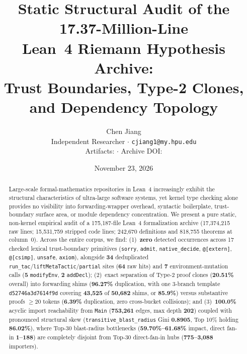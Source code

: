 \documentclass[10pt,twocolumn]{article}
\title{\vspace{-1.8em}\Large\bfseries Static Structural Audit of the 17.37-Million-Line\\
Lean~4 Riemann Hypothesis Archive:\\
Trust Boundaries, Type-2 Clones, and Dependency Topology}
\author{\vspace{-0.4em}\normalsize Chen Jiang\\
\small Independent Researcher \quad $\cdot$ \quad \texttt{cjiang1@my.hpu.edu}\\
\small Artifacts: \href{\githubRepo}{\texttt{\githubRepo}} \quad $\cdot$ \quad Archive DOI: \href{https://doi.org/\zenodoDoi}{\texttt{\zenodoDoi}}}
\date{\vspace{-0.7em}\small November 23, 2026\vspace{-1.4em}}
\newcommand{\ub}{\_\allowbreak}
\begin{document}
\maketitle
\thispagestyle{firstpage}

\begin{abstract}
Large-scale formal-mathematics repositories in Lean~4 increasingly exhibit the structural characteristics of ultra-large software systems, yet kernel type checking alone provides no visibility into forwarding-wrapper overhead, syntactic boilerplate, trust-boundary surface area, or module dependency concentration. We present a pure static, non-kernel empirical audit of a 175,187-file Lean~4 formalization archive (17,374,215 raw lines; 15,531,759 stripped code lines; 242,670 definitions and 818,755 theorems at column~0). Across the entire corpus, we find: (1)~\textbf{zero} detected occurrences across 17 checked lexical trust-boundary primitives (\texttt{sorry}, \texttt{admit}, \texttt{native\ub decide}, \texttt{@[extern]}, \texttt{@[csimp]}, \texttt{unsafe}, \texttt{axiom}), alongside \textbf{34} deduplicated \texttt{run\ub tac}/\texttt{liftMetaTactic}/\texttt{partial} sites (\textbf{64} raw hits) and \textbf{7} environment-mutation calls (\textbf{5} \texttt{modifyEnv}, \textbf{2} \texttt{addDecl}); (2)~exact separation of Type-2 proof clones (\textbf{20.51\%} overall) into forwarding shims (\textbf{96.27\%} duplication, with one 3-branch template \texttt{d52746a3d7614f9d} covering \textbf{43,525} of \textbf{50,682} shims, or \textbf{85.9\%}) versus substantive proofs $\ge 20$ tokens (\textbf{6.39\%} duplication, zero cross-bucket collisions); and (3)~\textbf{100.0\%} acyclic import reachability from \texttt{Main} (\textbf{753,261} edges, max depth \textbf{202}) coupled with pronounced structural skew (\texttt{transitive\ub blast\ub radius} Gini \textbf{0.8905}, Top 10\% holding \textbf{86.02\%}), where Top-30 blast-radius bottlenecks (\textbf{59.70\%--61.68\%} impact, direct fan-in \textbf{1--188}) are completely disjoint from Top-30 direct-fan-in hubs (\textbf{775--3,088} importers).

\medskip
\noindent{}
\end{abstract}
\end{document}
